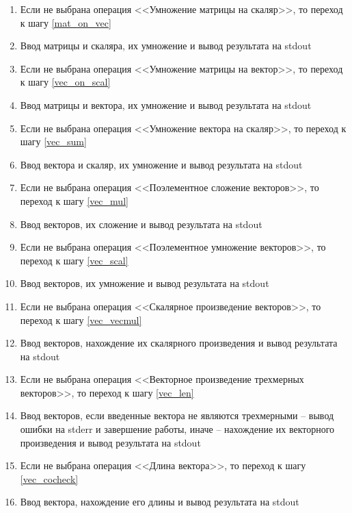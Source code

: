 \documentclass[a4paper,14pt]{extarticle}
\begin{document}
\begin{enumerate}
\item \label{mat_on_scal}
Если не выбрана операция <<Умножение матрицы на скаляр>>, то переход к шагу \ref{mat_on_vec}
\item Ввод матрицы и скаляра, их умножение и вывод результата на stdout
	
\item \label{mat_on_vec}
Если не выбрана операция <<Умножение матрицы на вектор>>, то переход к шагу \ref{vec_on_scal}
\item Ввод матрицы и вектора, их умножение и вывод результата на stdout

\item \label{vec_on_scal} 
Если не выбрана операция <<Умножение вектора на скаляр>>, то переход к шагу \ref{vec_sum}
\item Ввод вектора и скаляр, их умножение и вывод результата на stdout
	
\item \label{vec_sum} 
Если не выбрана операция <<Поэлементное сложение векторов>>, то переход к шагу \ref{vec_mul}
\item Ввод векторов, их сложение и вывод результата на stdout	
	
\item \label{vec_mul}
Если не выбрана операция <<Поэлементное умножение векторов>>, то переход к шагу \ref{vec_scal}
\item Ввод векторов, их умножение и вывод результата на stdout	
	
\item \label{vec_scal}
Если не выбрана операция <<Скалярное произведение векторов>>, то переход к шагу \ref{vec_vecmul}
\item Ввод векторов, нахождение их скалярного произведения и вывод результата на stdout		
	
\item \label{vec_vecmul}
Если не выбрана операция <<Векторное произведение трехмерных векторов>>, 
то переход к шагу \ref{vec_len}	
\item Ввод векторов, если введенные вектора не являются трехмерными -- 
вывод ошибки на stderr и завершение работы, 
иначе -- нахождение их векторного произведения и вывод результата на stdout
	
\item \label{vec_len}
Если не выбрана операция <<Длина вектора>>, то переход к шагу \ref{vec_cocheck}
\item Ввод вектора, нахождение его длины и вывод результата на stdout
	

\end{enumerate}
\end{document}
